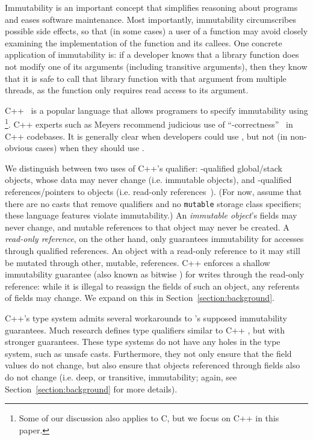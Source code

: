 Immutability is an important concept that simplifies reasoning about programs
and eases software maintenance.
Most importantly, immutability circumscribes possible side effects, 
so that (in some cases) a user of a function may avoid closely
examining the implementation of the function and its callees.
One concrete application of immutability is: if a developer knows that a library
function does not modify one of its arguments (including transitive arguments),
then they know that it is safe to call that library function with that argument
from multiple threads, as the function only requires read access to its
argument.

C++~\cite{programming-langauges-cpp-n3690} is a popular language that allows
programers to specify immutability using \const{}\footnote{Some of our
discussion also applies to C, but we focus
on C++ in this paper.}.
C++ experts such as Meyers recommend judicious use of
``\const{}-correctness''~\cite{effective-cpp} in C++ codebases.
It is generally clear when developers could use \const{}, but not (in
non-obvious cases) when they should use \const{}.

We distinguish between two uses of C++'s \const{} qualifier:
\const{}-qualified global/stack objects, whose data may never change (i.e.
immutable objects), and \const{}-qualified references/pointers to objects (i.e.
read-only references~\cite{lncs-2013-7850-potanin}).
(For now, assume that there are no casts that remove \const{} qualifiers and no
\texttt{mutable} storage class specifiers; these language features violate
immutability.)
An \emph{immutable object}'s fields may never change, and mutable references to
that object may never be created.
A \emph{read-only reference}, on the other hand, only guarantees immutability
for accesses through qualified references.
An object with a read-only reference to it may still be mutated through other,
mutable, references.
C++ enforces a shallow immutability guarantee (also known as bitwise \const{})
for writes through the read-only reference: while it is illegal to reassign the
fields of such an object, any referents of fields may change.
We expand on this in
Section~\ref{section:background}.

C++'s type system admits several workarounds to \const{}'s supposed
immutability guarantees.
Much research defines type qualifiers similar to C++ \const{}, but with stronger
guarantees.
These type systems do not have any holes in the type system, such as
unsafe casts.
Furthermore, they not only ensure that the field values do not change, but also ensure
that objects referenced through fields also do not change (i.e. deep, or
transitive, immutability; again, see Section~\ref{section:background} for more
details).


